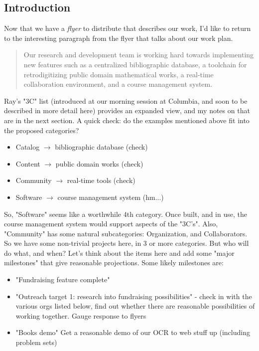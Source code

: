 \subsection{Introduction}
Now that we have a \emph{flyer} to distribute that describes our work,
I'd like to return to the interesting paragraph from the flyer that
talks about our work plan.  
\begin{quotation}
Our research and development team is working hard
towards implementing new features such as a
centralized bibliographic database, a toolchain for
retrodigitizing public domain mathematical works, a
real-time collaboration environment, and a course
management system.
\end{quotation}
Ray's "3C" list (introduced at our morning session at Columbia, and
soon to be described in more detail here) provides an expanded view,
and my notes on that are in the next section.
A quick check: do the examples mentioned above fit into the proposed
categories?
\begin{itemize}
\item[] Catalog $\rightarrow$ bibliographic database (check)
\item[] Content $\rightarrow$ public domain works (check)
\item[] Community $\rightarrow$ real-time tools (check)
\item[] Software $\rightarrow$ course management system (hm...)
\end{itemize}
So, "Software" seems like a worthwhile 4th category.  Once built, and
in use, the course management system would support aspects of the
"3C's".  Also, "Community" has some natural subcategories: Organization, and Collaborators.
So we have some non-trivial projects here, in 3 or more categories.
But who will do what, and when?
Let's think about the items here and add some "major milestones" that give reasonable projections.  Some likely milestones are:
\begin{itemize}
\item "Fundraising feature complete"
\item "Outreach target 1: research into fundraising possibilities" - check in with the various orgs listed below, find out whether there are reasonable possibilities of working together.  Gauge response to flyers
\item "Books demo" Get a reasonable demo of our OCR to web stuff up (including problem sets)
\end{itemize}

